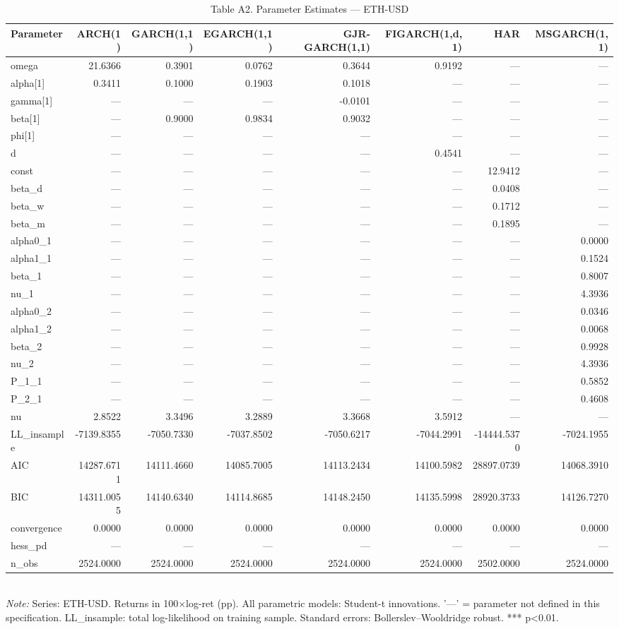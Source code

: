 \begin{table}[ht]
\centering
\caption{Table A2. Parameter Estimates — ETH-USD}
\label{tab:est_eth-usd}
\begin{tabular}{lrrrrrrr}
\toprule
Parameter & ARCH(1) & GARCH(1,1) & EGARCH(1,1) & GJR-GARCH(1,1) & FIGARCH(1,d,1) & HAR & MSGARCH(1,1) \\
\midrule
omega & 21.6366 & 0.3901 & 0.0762 & 0.3644 & 0.9192 & — & — \\
alpha[1] & 0.3411 & 0.1000 & 0.1903 & 0.1018 & — & — & — \\
gamma[1] & — & — & — & -0.0101 & — & — & — \\
beta[1] & — & 0.9000 & 0.9834 & 0.9032 & — & — & — \\
phi[1] & — & — & — & — & — & — & — \\
d & — & — & — & — & 0.4541 & — & — \\
const & — & — & — & — & — & 12.9412 & — \\
beta_d & — & — & — & — & — & 0.0408 & — \\
beta_w & — & — & — & — & — & 0.1712 & — \\
beta_m & — & — & — & — & — & 0.1895 & — \\
alpha0_1 & — & — & — & — & — & — & 0.0000 \\
alpha1_1 & — & — & — & — & — & — & 0.1524 \\
beta_1 & — & — & — & — & — & — & 0.8007 \\
nu_1 & — & — & — & — & — & — & 4.3936 \\
alpha0_2 & — & — & — & — & — & — & 0.0346 \\
alpha1_2 & — & — & — & — & — & — & 0.0068 \\
beta_2 & — & — & — & — & — & — & 0.9928 \\
nu_2 & — & — & — & — & — & — & 4.3936 \\
P_1_1 & — & — & — & — & — & — & 0.5852 \\
P_2_1 & — & — & — & — & — & — & 0.4608 \\
nu & 2.8522 & 3.3496 & 3.2889 & 3.3668 & 3.5912 & — & — \\
LL_insample & -7139.8355 & -7050.7330 & -7037.8502 & -7050.6217 & -7044.2991 & -14444.5370 & -7024.1955 \\
AIC & 14287.6711 & 14111.4660 & 14085.7005 & 14113.2434 & 14100.5982 & 28897.0739 & 14068.3910 \\
BIC & 14311.0055 & 14140.6340 & 14114.8685 & 14148.2450 & 14135.5998 & 28920.3733 & 14126.7270 \\
convergence & 0.0000 & 0.0000 & 0.0000 & 0.0000 & 0.0000 & 0.0000 & 0.0000 \\
hess_pd & — & — & — & — & — & — & — \\
n_obs & 2524.0000 & 2524.0000 & 2524.0000 & 2524.0000 & 2524.0000 & 2502.0000 & 2524.0000 \\
\bottomrule
\end{tabular}
\\[3pt]\footnotesize\textit{Note:} Series: ETH-USD. Returns in 100×log-ret (pp). All parametric models: Student-t innovations. '—' = parameter not defined in this specification. LL_insample: total log-likelihood on training sample. Standard errors: Bollerslev–Wooldridge robust. *** p<0.01.
\end{table}